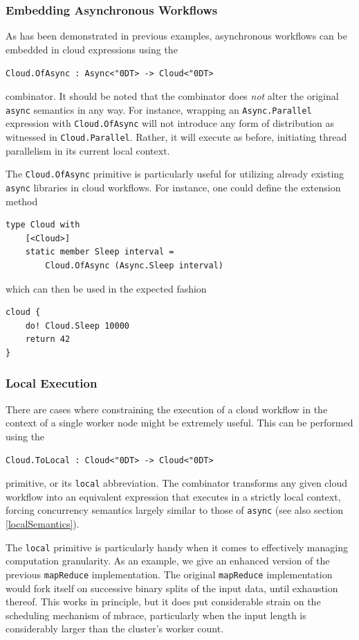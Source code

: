 \documentclass[9pt,a4paper]{article}
\newcommand{\mbrace}{mbrace}
\newcommand{\centertt}[1]{\begin{center}\texttt{#1}\end{center}}
\newcommand{\uq}{\char"0D}
\begin{document}
\subsubsection*{Embedding Asynchronous Workflows}

As has been demonstrated in previous examples, asynchronous workflows can be
embedded in cloud expressions using the
\centertt{Cloud.OfAsync : Async<\uq{}T> -> Cloud<\uq{}T>}
combinator. It should be noted that the combinator does \emph{not} alter the
original \texttt{async} semantics in any way. For instance, wrapping an
\texttt{Async.Parallel} expression with \texttt{Cloud.OfAsync} will not introduce
any form of distribution as witnessed in \texttt{Cloud.Parallel}. Rather,
it will execute as before, initiating thread parallelism in its current
local context.

The \texttt{Cloud.OfAsync} primitive is particularly useful for utilizing
already existing \texttt{async} libraries in cloud workflows. For instance,
one could define the extension method
\begin{lstlisting}
type Cloud with
    [<Cloud>]
    static member Sleep interval = 
    	Cloud.OfAsync (Async.Sleep interval)
\end{lstlisting}
which can then be used in the expected fashion
\begin{lstlisting}
cloud {
    do! Cloud.Sleep 10000
    return 42
}
\end{lstlisting}

\subsubsection*{Local Execution}
\label{localCombinator}

There are cases where constraining the execution of a cloud workflow in the context of a
single worker node might be extremely useful. This can be performed using the
\centertt{Cloud.ToLocal : Cloud<\uq{}T> -> Cloud<\uq{}T>}
primitive, or its \texttt{local} abbreviation. The combinator transforms any given
cloud workflow into an equivalent expression that executes in a strictly local context,
forcing concurrency semantics largely similar to those of \texttt{async} (see also section \ref{localSemantics}).

The \texttt{local} primitive is particularly handy when it comes to effectively managing 
computation granularity. As an example, we give an enhanced version of the previous 
\texttt{mapReduce} implementation. The original \texttt{mapReduce} implementation would 
fork itself on successive binary splits of the input data, until exhaustion thereof.
This works in principle, but it does put considerable strain on the scheduling mechanism of
\mbrace, particularly when the input length is considerably larger than the cluster's
worker count.
\end{document}
